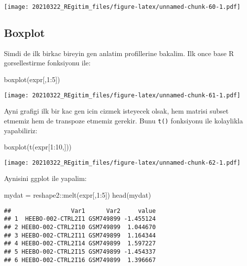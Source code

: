 \documentclass[
]{book}
\newenvironment{Shaded}{\begin{snugshade}}{\end{snugshade}}
\newcommand{\DecValTok}[1]{\textcolor[rgb]{0.00,0.00,0.81}{#1}}
\newcommand{\FunctionTok}[1]{\textcolor[rgb]{0.00,0.00,0.00}{#1}}
\newcommand{\NormalTok}[1]{#1}
\newcommand{\OtherTok}[1]{\textcolor[rgb]{0.56,0.35,0.01}{#1}}
\newcommand{\SpecialCharTok}[1]{\textcolor[rgb]{0.00,0.00,0.00}{#1}}
\begin{document}
\texttt{[image: 20210322\_REgitim\_files/figure-latex/unnamed-chunk-60-1.pdf]}

\hypertarget{boxplot}{%
\subsection{Boxplot}\label{boxplot}}

Simdi de ilk birkac bireyin gen anlatim profillerine bakalim. Ilk once base R gorsellestirme fonksiyonu ile:

\begin{Shaded}
\begin{Highlighting}[]
\FunctionTok{boxplot}\NormalTok{(expr[,}\DecValTok{1}\SpecialCharTok{:}\DecValTok{5}\NormalTok{])}
\end{Highlighting}
\end{Shaded}

\texttt{[image: 20210322\_REgitim\_files/figure-latex/unnamed-chunk-61-1.pdf]}

Ayni grafigi ilk bir kac gen icin cizmek isteyecek olsak, hem matrisi subset etmemiz hem de transpoze etmemiz gerekir. Bunu \texttt{t()} fonksiyonu ile kolaylikla yapabiliriz:

\begin{Shaded}
\begin{Highlighting}[]
\FunctionTok{boxplot}\NormalTok{(}\FunctionTok{t}\NormalTok{(expr[}\DecValTok{1}\SpecialCharTok{:}\DecValTok{10}\NormalTok{,]))}
\end{Highlighting}
\end{Shaded}

\texttt{[image: 20210322\_REgitim\_files/figure-latex/unnamed-chunk-62-1.pdf]}

Aynisini ggplot ile yapalim:

\begin{Shaded}
\begin{Highlighting}[]
\NormalTok{mydat }\OtherTok{=}\NormalTok{ reshape2}\SpecialCharTok{::}\FunctionTok{melt}\NormalTok{(expr[,}\DecValTok{1}\SpecialCharTok{:}\DecValTok{5}\NormalTok{])}
\FunctionTok{head}\NormalTok{(mydat)}
\end{Highlighting}
\end{Shaded}

\begin{verbatim}
##                 Var1      Var2     value
## 1  HEEBO-002-CTRL2I1 GSM749899 -1.455124
## 2 HEEBO-002-CTRL2I10 GSM749899  1.044670
## 3 HEEBO-002-CTRL2I11 GSM749899  1.164344
## 4 HEEBO-002-CTRL2I14 GSM749899  1.597227
## 5 HEEBO-002-CTRL2I15 GSM749899 -1.454337
## 6 HEEBO-002-CTRL2I16 GSM749899  1.396667
\end{verbatim}
\end{document}

